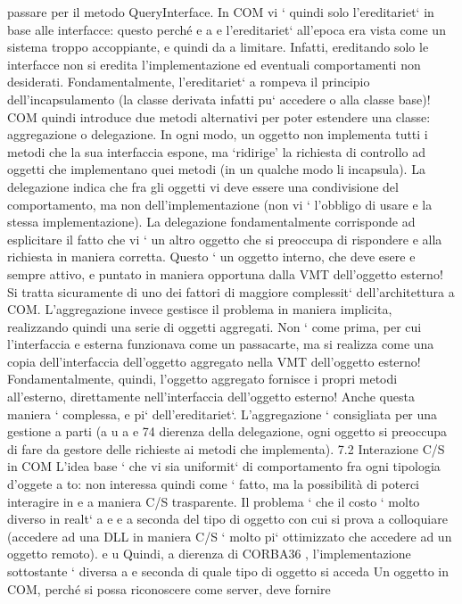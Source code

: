 \documentclass[a4paper,12pt]{article}
\begin{document}
passare per il metodo QueryInterface.
In COM vi ` quindi solo l'ereditariet` in base alle interfacce: questo perché
e
a
e
l'ereditariet` all'epoca era vista come un sistema troppo accoppiante, e quindi da
a
limitare. Infatti, ereditando solo le interfacce non si eredita l'implementazione
ed eventuali comportamenti non desiderati. Fondamentalmente, l'ereditariet`
a
rompeva il principio dell'incapsulamento (la classe derivata infatti pu` accedere
o
alla classe base)!
COM quindi introduce due metodi alternativi per poter estendere una classe:
aggregazione o delegazione. In ogni modo, un oggetto non implementa tutti i
metodi che la sua interfaccia espone, ma {`}ridirige' la richiesta di controllo ad
oggetti che implementano quei metodi (in un qualche modo li incapsula).
La delegazione indica che fra gli oggetti vi deve essere una condivisione
del comportamento, ma non dell'implementazione (non vi ` l'obbligo di usare
e
la stessa implementazione). La delegazione fondamentalmente corrisponde ad
esplicitare il fatto che vi ` un altro oggetto che si preoccupa di rispondere
e
alla richiesta in maniera corretta. Questo ` un oggetto interno, che deve esere
e
sempre attivo, e puntato in maniera opportuna dalla VMT dell'oggetto esterno!
Si tratta sicuramente di uno dei fattori di maggiore complessit` dell'architettura
a
COM.
L'aggregazione invece gestisce il problema in maniera implicita, realizzando
quindi una serie di oggetti aggregati. Non ` come prima, per cui l'interfaccia
e
esterna funzionava come un passacarte, ma si realizza come una copia dell'interfaccia dell'oggetto aggregato nella VMT
dell'oggetto esterno! Fondamentalmente, quindi, l'oggetto aggregato fornisce i propri metodi all'esterno, direttamente
nell'interfaccia dell'oggetto esterno! Anche questa maniera ` complessa,
e
pi` dell'ereditariet`. L'aggregazione ` consigliata per una gestione a parti (a
u
a
e
74
dierenza della delegazione, ogni oggetto si preoccupa di fare da gestore delle
richieste ai metodi che implementa).
7.2
Interazione C/S in COM
L'idea base ` che vi sia uniformit` di comportamento fra ogni tipologia d'oggete
a
to: non interessa quindi come ` fatto, ma la possibilità di poterci interagire in
e
a
maniera C/S trasparente. Il problema ` che il costo ` molto diverso in realt` a
e
e
a
seconda del tipo di oggetto con cui si prova a colloquiare (accedere ad una DLL
in maniera C/S ` molto pi` ottimizzato che accedere ad un oggetto remoto).
e
u
Quindi, a dierenza di CORBA36 , l'implementazione sottostante ` diversa a
e
seconda di quale tipo di oggetto si acceda
Un oggetto in COM, perché si possa riconoscere come server, deve fornire
\end{document}
